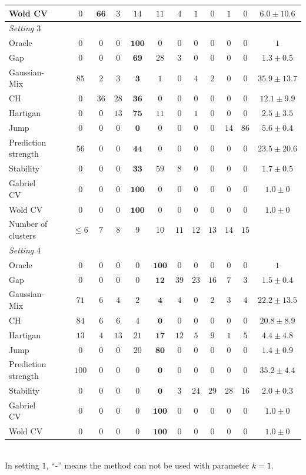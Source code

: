 \documentclass[11pt]{article}
\begin{document}
\begin{table}[H]
{\begin{tabular}{ lccccccccccccc}
Wold CV&&& $0$&$\mathbf{66}$&$3$&$14$&$11$&$4$&$1$&$0$&$1$&$0$&$6.0\pm 10.6$\\ 
\hline
\textit{Setting $3$} &&& &&&&&&&&& \\
Oracle&&& $0$&$0$&$0$&$\mathbf{100}$&$0$&$0$&$0$&$0$&$0$&$0$&$1$\\ 
Gap&&& $0$&$0$&$0$&$\mathbf{69}$&$28$&$3$&$0$&$0$&$0$&$0$&$1.3\pm 0.5$\\ 
Gaussian-Mix&&& $85$&$2$&$3$&$\mathbf{3}$&$1$&$0$&$4$&$2$&$0$&$0$&$35.9\pm 13.7$\\ 
CH&&& $0$&$36$&$28$&$\mathbf{36}$&$0$&$0$&$0$&$0$&$0$&$0$&$12.1\pm 9.9$\\ 
Hartigan&&& $0$&$0$&$13$&$\mathbf{75}$&$11$&$0$&$1$&$0$&$0$&$0$&$2.5\pm 3.5$\\
Jump&&& $0$&$0$&$0$&$\mathbf{0}$&$0$&$0$&$0$&$0$&$14$&$86$&$5.6\pm 0.4$\\ 
Prediction strength&&&$56$&$0$&$0$&$\mathbf{44}$&$0$&$0$&$0$&$0$&$0$&$0$&$23.5\pm 20.6$\\ 
Stability&&& $0$&$0$&$0$&$\mathbf{33}$&$59$&$8$&$0$&$0$&$0$&$0$&$1.7\pm 0.5$\\
Gabriel CV&&& $0$&$0$&$0$&$\mathbf{100}$&$0$&$0$&$0$&$0$&$0$&$0$&$1.0\pm 0$\\ 
Wold CV&&& $0$&$0$&$0$&$\mathbf{100}$&$0$&$0$&$0$&$0$&$0$&$0$&$1.0\pm 0$\\ 
\hline
 Number of clusters &&& $\leq 6$&$7$&$8$&$9$&$10$&$11$&$12$&$13$&$14$&$15$ \\ \hline
\textit{Setting $4$} &&& &&&&&&&&& \\
Oracle&&& $0$&$0$&$0$&$0$&$\mathbf{100}$&$0$&$0$&$0$&$0$&$0$&$1$\\ 
Gap&&& $0$&$0$&$0$&$0$&$\mathbf{12}$&$39$&$23$&$16$&$7$&$3$&$1.5\pm 0.4$\\ 
Gaussian-Mix&&& $71$&$6$&$4$&$2$&$\mathbf{4}$&$4$&$0$&$2$&$3$&$4$&$22.2\pm 13.5$\\ 
CH&&& $84$&$6$&$6$&$4$&$\mathbf{0}$&$0$&$0$&$0$&$0$&$0$&$20.8\pm 8.9$\\ 
Hartigan&&& $13$&$4$&$13$&$21$&$\mathbf{17}$&$12$&$5$&$9$&$1$&$5$&$4.4\pm 4.8$\\
Jump&&& $0$&$0$&$0$&$20$&$\mathbf{80}$&$0$&$0$&$0$&$0$&$0$&$1.4\pm 0.9$\\ 
Prediction strength&&&$100$&$0$&$0$&$0$&$\mathbf{0}$&$0$&$0$&$0$&$0$&$0$&$35.2\pm 4.4$\\ 
Stability&&& $0$&$0$&$0$&$0$&$\mathbf{0}$&$3$&$24$&$29$&$28$&$16$&$2.0\pm 0.3$\\
Gabriel CV&&&  $0$&$0$&$0$&$0$&$\mathbf{100}$&$0$&$0$&$0$&$0$&$0$&$1.0\pm 0$\\  
Wold CV&&&  $0$&$0$&$0$&$0$&$\mathbf{100}$&$0$&$0$&$0$&$0$&$0$&$1.0\pm 0$\\ 
\hline
\end{tabular}
}\\
\hspace{-2.0in} \footnotesize {In setting $1$, ``-'' means the method can not be used with parameter $k=1$}.
\end{table}
\end{document}
